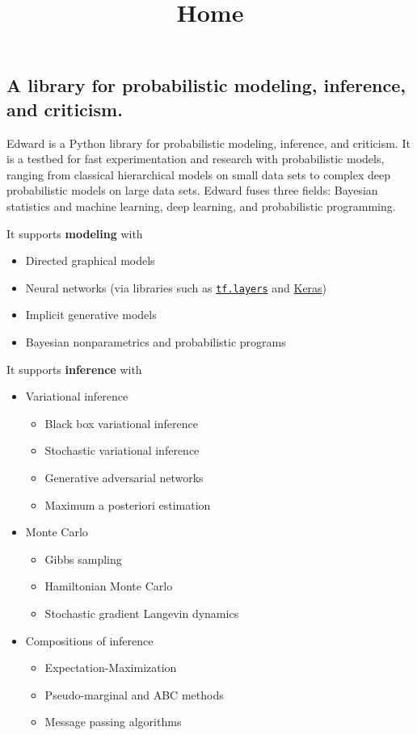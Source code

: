 \title{Home}

\subsection{A library for probabilistic modeling, inference, and criticism.}

Edward is a Python library for probabilistic modeling, inference, and
criticism. It is a testbed for fast experimentation and research with
probabilistic models, ranging from classical hierarchical models on
small data sets to complex deep probabilistic models on large data
sets. Edward fuses three fields: Bayesian statistics and machine
learning, deep learning, and probabilistic programming.

It supports \textbf{modeling} with

\begin{itemize}
\item Directed graphical models
\item Neural networks (via libraries such as
  \href{https://www.tensorflow.org/api_docs/python/tf/layers}{\texttt{tf.layers}}
  and
  \href{http://keras.io}{Keras})
\item Implicit generative models
\item Bayesian nonparametrics and probabilistic programs
\end{itemize}

It supports \textbf{inference} with

\begin{itemize}
\item Variational inference
  \begin{itemize}
    \item Black box variational inference
    \item Stochastic variational inference
    \item Generative adversarial networks
    \item Maximum a posteriori estimation
  \end{itemize}
\item Monte Carlo
  \begin{itemize}
    \item Gibbs sampling
    \item Hamiltonian Monte Carlo
    \item Stochastic gradient Langevin dynamics
  \end{itemize}
\item Compositions of inference
  \begin{itemize}
    \item Expectation-Maximization
    \item Pseudo-marginal and ABC methods
    \item Message passing algorithms
  \end{itemize}
\end{itemize}

